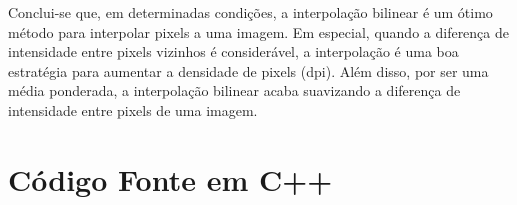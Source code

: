 \documentclass{article}
\begin{document}
\vbox{} Conclui-se que, em determinadas condições, a interpolação bilinear é um ótimo método para interpolar pixels a uma imagem. Em especial, quando a diferença de intensidade entre pixels vizinhos é considerável, a interpolação é uma boa estratégia para aumentar a densidade de pixels (dpi). Além disso, por ser uma média ponderada, a interpolação bilinear acaba suavizando a diferença de intensidade entre pixels de uma imagem.
\section{Código Fonte em C++}
% 
% 
\end{document}
